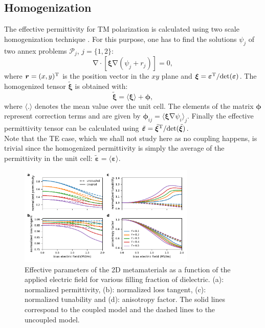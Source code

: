 \documentclass[%
 aip,
 amsmath,amssymb,
 reprint,%
]{revtex4-1}
\newcommand{\B}{\boldsymbol}
\newcommand{\tens}[1]{\B{#1}}
\newcommand{\grad}{\B{\mathrm{\nabla}}}
\renewcommand{\div}{\B{\mathrm{\nabla\cdotp}}}
\newcommand{\epstens}{\tens{\varepsilon}}
\newcommand{\epshom}{\tilde{\epstens}}
\newcommand{\xitens}{\tens{\xi}}
\newcommand{\xihom}{\tilde{\xitens}}
\begin{document}
\subsection{Homogenization}
The effective permittivity for TM polarization is calculated
using two scale homogenization technique \cite{allaire_homogenization_1992, guenneau_homogenization_2000}.
For this purpose, one has to find the solutions
$\psi_j$ of two annex problems $\mathcal P_j$, $j=\{1, 2\}$:
\begin{equation}
 \div \left[ \xitens \grad(\psi_j + r_j) \right] = 0,
 \label{eq_hom_annex}
\end{equation}
where $\B r = (x, y)^{\rm T}$ is the position vector in the $xy$ plane and
$\xitens=\epstens^{\rm T}/ {\rm det }(\epstens)$.
The homogenized tensor $\xihom$ is obtained with:
\begin{equation}
 \xihom = \langle \xitens \rangle + \B \phi,
 \label{eq_hom}
\end{equation}
where $\langle . \rangle$ denotes the mean value over the unit cell.
The elements of the matrix $\B \phi$ represent correction terms and
are given by $\B \phi_{ij} = \langle \xitens \grad \psi_i \rangle_j$.
Finally the effective permittivity tensor can be calculated using $\epshom=\xihom^{\rm T}/ {\rm det }(\xihom)$.\\
Note that the TE case, which we shall not study here as no coupling happens, is trivial since
the homogenized permittivity is simply the average of the permittivity in the unit cell:
$\epshom = \langle \epstens \rangle$.







\begin{figure}[!t]
 \centering
 \includegraphics[width=0.75\textwidth]{effective_params_per}
 \caption{Effective parameters of the 2D metamaterials as a function of the
  applied electric field for various filling fraction of dielectric.
  (a): normalized permittivity, (b): normalized loss tangent, (c): normalized tunability and
  (d): anisotropy factor. The solid lines correspond to the coupled model and
  the dashed lines to the uncoupled model.}
 \label{eff_par_2D_TM}
\end{figure}
\end{document}
